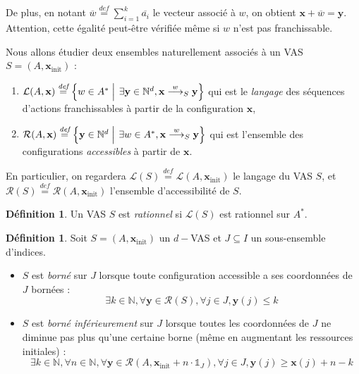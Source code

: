 \documentclass[a4paper,final]{article}
\theoremstyle{definition}
\newtheorem{Definition}[Theorem]{Définition}
\let\leq\leqslant
\let\geq\geqslant
\newcommand{\set}[2]{\left\{#1\mathrel{\left|\vphantom{#1}\vphantom{#2}\right.}#2\right\}}
\newcommand{\defeq}{\ensuremath{\stackrel{\textit{def}}{=}}}
\newcommand{\N}{\ensuremath{\mathbb{N}}}
\newcommand{\indicatrice}[1]{\ensuremath{\mathds{1}_{#1}}}
\newcommand{\lang}{\ensuremath{\mathcal{L}}}
\newcommand{\reach}{\ensuremath{\mathcal{R}}}
\newcommand{\trans}[2]{\ensuremath{\stackrel{#1}{\longrightarrow}_{#2}}}
\newcommand{\vect}[1]{\ensuremath{\mathbf{#1}}}
\newcommand{\xinit}{\ensuremath{\vect{x}_\text{init}}}
\newcommand{\valeur}[1]{\ensuremath{\overline{#1}}}
\begin{document}
De plus, en notant $\valeur{w}\defeq \sum^k_{i=1} \valeur{a_i}$ le vecteur associé à $w$, on obtient $\vect{x} +\valeur{w} = \vect{y}$.
Attention, cette égalité peut-être vérifiée même si $w$ n'est pas franchissable.
\vspace{3mm}

Nous allons étudier deux ensembles naturellement associés à un VAS $S=(A,\xinit)$ :
\begin{enumerate}
    \item 
    $\lang(A,\vect{x})\defeq \set{w\in A^\ast} {\exists \vect{y}\in\N^d, \vect{x}\trans{w}{S}\vect{y}}$ qui est le \emph{langage} des séquences d'actions franchissables à partir de la configuration $\vect{x}$,
    
    \item $\reach(A,\vect{x})\defeq \set{\vect{y}\in\N^d} {\exists w\in A^\ast, \vect{x}\trans{w}{S} \vect{y}}$ qui est l'ensemble des configurations \emph{accessibles} à partir de $\vect{x}$. 
\end{enumerate}

En particulier, on regardera $\lang(S) \defeq \lang(A,\xinit)$ le langage du VAS $S$, et $\reach(S) \defeq \reach(A,\xinit)$ l'ensemble d'accessibilité de $S$.

\begin{Definition}
Un VAS $S$ est \emph{rationnel} si $\lang(S)$ est rationnel sur $A^\ast$.
\end{Definition}

\begin{Definition}
Soit $S = (A,\xinit)$ un $d-$VAS et $J\subseteq I$ un sous-ensemble d'indices.
\begin{itemize}
    \item $S$ est \emph{borné} sur $J$ lorsque toute configuration accessible a ses coordonnées de $J$ bornées :
    $$\exists k\in\N, \forall \vect{y}\in\reach(S), \forall j\in J, \vect{y}(j)\leq k$$
    
    \item $S$ est \emph{borné inférieurement} sur $J$ lorsque toutes les coordonnées de $J$ ne diminue pas plus qu'une certaine borne (même en augmentant les ressources initiales) :
    $$\exists k\in\N, \forall n\in\N, \forall \vect{y}\in\reach(A,\xinit + n\cdot\indicatrice{J}), \forall j\in J, \vect{y}(j)\geq \vect{x}(j)+n-k$$
\end{itemize}
\end{Definition}
\end{document}
